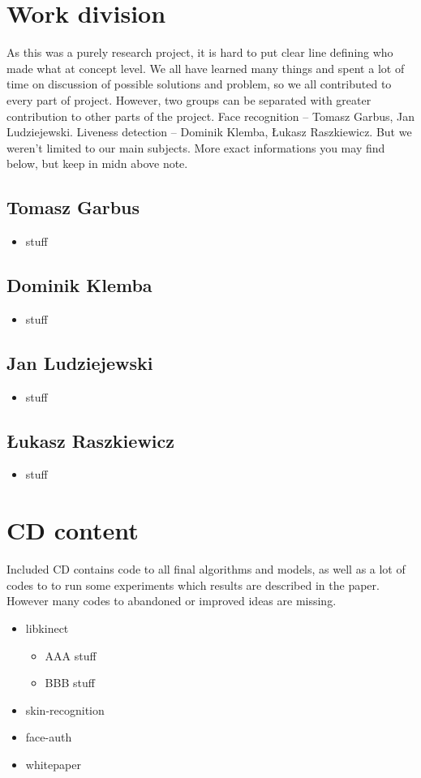 \chapter{Work division}
    As this was a purely research project, it is hard to
    put clear line defining who made what at concept level.
    We all have learned many things and spent a lot of time
    on discussion of possible solutions and problem,
    so we all contributed to every part of project.
    However, two groups can be separated
    with greater contribution to other parts of the project.
    Face recognition -- Tomasz Garbus, Jan Ludziejewski.
    Liveness detection -- Dominik Klemba, Łukasz Raszkiewicz.
    But we weren't limited to our main subjects.
    More exact informations you may find below,
    but keep in midn above note.

    \section{Tomasz Garbus}
        \begin{itemize}
            \item stuff
        \end{itemize}

    \section{Dominik Klemba}
        \begin{itemize}
            \item stuff
        \end{itemize}

    \section{Jan Ludziejewski}
        \begin{itemize}
            \item stuff
        \end{itemize}

    \section{Łukasz Raszkiewicz}
        \begin{itemize}
            \item stuff
        \end{itemize}



\chapter{CD content}
    Included CD contains code to all final algorithms
    and models, as well as a lot of codes to
    to run some experiments which results are described in the paper.
    However many codes to abandoned or improved ideas are missing.

    \begin{itemize}
        \item libkinect
        \begin{itemize}
            \item AAA stuff
            \item BBB stuff
        \end{itemize}
        \item skin-recognition
        \item face-auth
        \item whitepaper
    \end{itemize}
